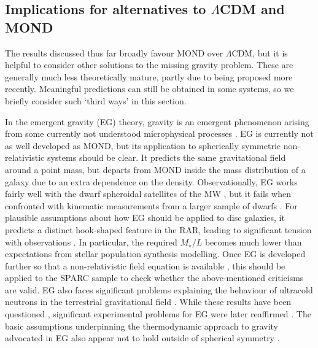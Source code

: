 \documentclass[fleqn,usenatbib,useAMS]{mnras} %
\begin{document}
\subsection{Implications for alternatives to \texorpdfstring{$\Lambda$}{L}CDM and MOND}
\label{Alternatives_LCDM_MOND}

The results discussed thus far broadly favour MOND over $\Lambda$CDM, but it is helpful to consider other solutions to the missing gravity problem. These are generally much less theoretically mature, partly due to being proposed more recently. Meaningful predictions can still be obtained in some systems, so we briefly consider such `third ways' in this section.

In the emergent gravity (EG) theory, gravity is an emergent phenomenon arising from some currently not understood microphysical processes \citep{Verlinde_2017}. EG is currently not as well developed as MOND, but its application to spherically symmetric non-relativistic systems should be clear. It predicts the same gravitational field around a point mass, but departs from MOND inside the mass distribution of a galaxy due to an extra dependence on the density. Observationally, EG works fairly well with the dwarf spheroidal satellites of the MW \citep{Dias_Tejedor_2018}, but it fails when confronted with kinematic measurements from a larger sample of dwarfs \citep{Bradford_2015, Pardo_2020_EG}. For plausible assumptions about how EG should be applied to disc galaxies, it predicts a distinct hook-shaped feature in the RAR, leading to significant tension with observations \citep*{Lelli_2017_EG}. In particular, the required $M_{\star}/L$ becomes much lower than expectations from stellar population synthesis modelling. Once EG is developed further so that a non-relativistic field equation is available \citep[e.g.][]{Hossenfelder_2017}, this should be applied to the SPARC sample to check whether the above-mentioned criticisms are valid. EG also faces significant problems explaining the behaviour of ultracold neutrons in the terrestrial gravitational field \citep{Kobakhidze_2011}. While these results have been questioned \citep{Chaichian_2011}, significant experimental problems for EG were later reaffirmed \citep{Kobakhidze_2011b}. The basic assumptions underpinning the thermodynamic approach to gravity advocated in EG also appear not to hold outside of spherical symmetry \citep{Wang_2018_EG}.
\end{document}
